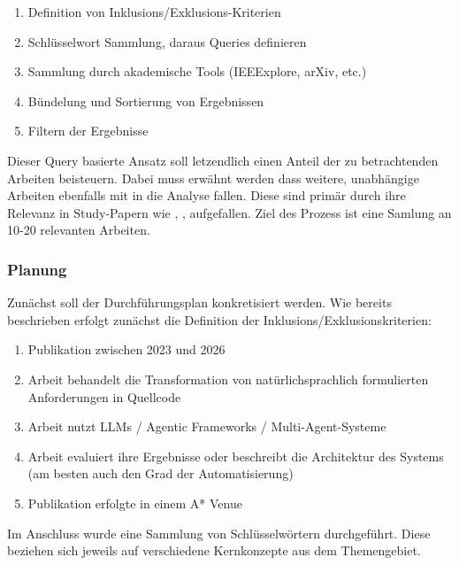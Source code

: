 \begin{enumerate}
    \item Definition von Inklusions/Exklusions-Kriterien
    \item Schlüsselwort Sammlung, daraus Queries definieren
    \item Sammlung durch akademische Tools (IEEExplore, arXiv, etc.)
    \item Bündelung und Sortierung von Ergebnissen
    \item Filtern der Ergebnisse
\end{enumerate}

Dieser Query basierte Ansatz soll letzendlich einen Anteil der zu betrachtenden Arbeiten beisteuern. Dabei muss erwähnt werden dass weitere, unabhängige Arbeiten ebenfalls mit in die Analyse fallen. Diese sind primär durch ihre Relevanz in Study-Papern wie \cite{jiangSurveyLargeLanguage2026}, \cite{chenSurveyEvaluatingLarge2025}, \cite{guoComprehensiveSurveyBenchmarks2025} aufgefallen. Ziel des Prozess ist eine Samlung an 10-20 relevanten Arbeiten.

\subsubsection{Planung}

Zunächst soll der Durchführungsplan konkretisiert werden. Wie bereits beschrieben erfolgt zunächst die Definition der Inklusions/Exklusionskriterien:

\begin{enumerate}
    \item Publikation zwischen 2023 und 2026
    \item Arbeit behandelt die Transformation von natürlichsprachlich formulierten Anforderungen in Quellcode
    \item Arbeit nutzt LLMs / Agentic Frameworks / Multi-Agent-Systeme
    \item Arbeit evaluiert ihre Ergebnisse oder beschreibt die Architektur des Systems (am besten auch den Grad der Automatisierung)
    \item Publikation erfolgte in einem A* Venue
\end{enumerate}

Im Anschluss wurde eine Sammlung von Schlüsselwörtern durchgeführt. Diese beziehen sich jeweils auf verschiedene Kernkonzepte aus dem Themengebiet.

